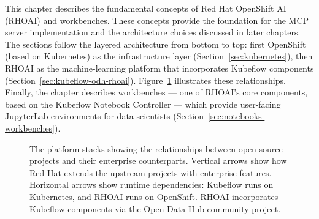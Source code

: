 \documentclass[
  digital,     %
  oneside,     %
  nosansbold,  %
  nocolorbold, %
  lof,         %
  lot,         %
]{fithesis4}
\begin{document}
This chapter describes the fundamental concepts of Red Hat OpenShift AI
(RHOAI) and workbenches. These concepts provide the foundation for the MCP
server implementation and the architecture choices discussed in later
chapters. The sections follow the layered architecture from bottom to top:
first OpenShift (based on Kubernetes) as the infrastructure layer
(Section~\ref{sec:kubernetes}), then RHOAI as the machine-learning platform
that incorporates Kubeflow components (Section~\ref{sec:kubeflow-odh-rhoai}).
Figure~\ref{fig:platform-stacks} illustrates these relationships. Finally,
the chapter describes workbenches --- one of RHOAI's core components, based
on the Kubeflow Notebook Controller --- which provide user-facing JupyterLab
environments for data scientists (Section~\ref{sec:notebooks-workbenches}).

\begin{figure}[htbp]
\begin{center}
\end{center}
\caption[The platform stacks]{The platform stacks showing the relationships
between open-source projects and their enterprise counterparts. Vertical
arrows show how Red Hat extends the upstream projects with enterprise
features. Horizontal arrows show runtime dependencies: Kubeflow runs on
Kubernetes, and RHOAI runs on OpenShift. RHOAI incorporates Kubeflow
components via the Open Data Hub community project.}
\label{fig:platform-stacks}
\end{figure}
\end{document}
